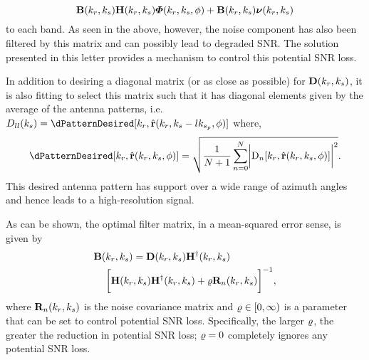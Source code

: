 \documentclass[journal]{IEEEtran}
\begin{document}
\begin{equation}
	\hrwsFilterMatrix(\kargs)\antennaMatrix(\kargs)\vkernvect(\kr, \kparm, \depression) + \hrwsFilterMatrix(\kargs)\boldsymbol{\nu}(\kr, \kparm)
\end{equation}
to each band. As seen in the above, however, the noise component has also been filtered by this matrix and can possibly lead to degraded SNR. The solution presented in this letter provides a mechanism to control this potential SNR loss. 
\par
In addition to desiring a diagonal matrix (or as close as possible) for $\diagAntennaMatrix(\kargs)$, it is also fitting to select this matrix such that it has diagonal elements given by the average of the antenna patterns, i.e. $D_{ll}(\kparm) = \dPatternDesired[\kr,\uRangeVector{\kr, \kparm-l\kparmPRF, \targetdepression}]$ where,
\begin{equation}
 \dPatternDesired[\kr,\uRangeVector{\kveczero, \targetdepression}]=\sqrt{\frac{1}{N+1}\sum_{n=0}^{N}\biggl\lvert\dPattern{n}[\kr,\uRangeVector{\kveczero, \targetdepression}]\biggr\rvert^2}.
\end{equation}
This desired antenna pattern has support over a wide range of azimuth angles and hence leads to a high-resolution signal.
\par
As can be shown, the optimal filter matrix, in a mean-squared error sense, is given by \cite{NovelRadar}
\begin{equation}
\begin{split}
 \hrwsFilterMatrix(&\kargs)=\diagAntennaMatrix(\kargs)\htr{\antennaMatrix}(\kargs)\\
 &\biggl[\antennaMatrix(\kargs)\htr{\antennaMatrix}(\kargs)+\cost\mtx{R}_n(\kargs)\biggr]^{-1},
\end{split}
\end{equation}
where $\mtx{R}_n(\kargs)$ is the noise covariance matrix and $\varrho\in[0,\infty)$ is a parameter that can be set to control potential SNR loss. Specifically, the larger $\varrho$, the greater the reduction in potential SNR loss; $\varrho=0$ completely ignores any potential SNR loss.


\end{document}
